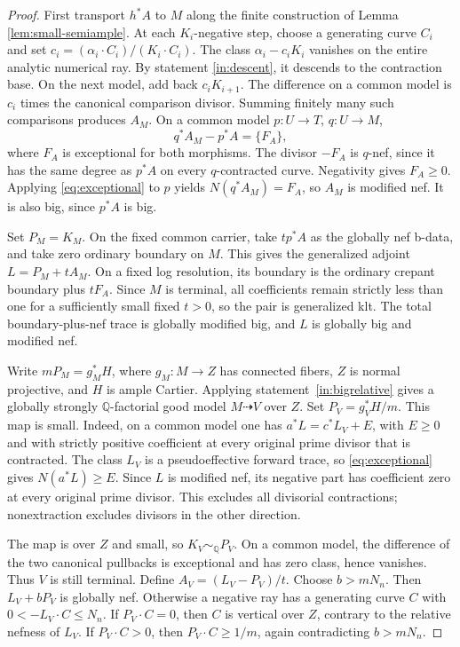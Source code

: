 \documentclass[11pt,a4paper]{article}
\theoremstyle{definition}\newtheorem{definition}[theorem]{Definition}
\theoremstyle{remark}\newtheorem*{remark}{Remark}
\newcommand{\Q}{\mathbb Q}\newcommand{\C}{\mathbb C}
\begin{document}
\begin{proof}
First transport $h^*A$ to $M$ along the finite construction of
Lemma \ref{lem:small-semiample}. At
each $K_i$-negative step, choose a generating curve $C_i$ and set
$c_i=(\alpha_i\cdot C_i)/(K_i\cdot C_i)$.
The class $\alpha_i-c_iK_i$ vanishes on the entire analytic numerical ray.
By statement \ref{in:descent}, it descends to the contraction base. On the next
model, add back $c_iK_{i+1}$. The difference on a common model is $c_i$ times
the canonical comparison divisor. Summing finitely many such
comparisons produces $A_M$. On a common model $p:U\to T$, $q:U\to M$,
\begin{equation}\label{eq:A-transport}
 q^*A_M-p^*A=\{F_A\},
\end{equation}
where $F_A$ is exceptional for both morphisms. The divisor $-F_A$ is $q$-nef,
since it has the same degree as $p^*A$ on every $q$-contracted curve.
Negativity gives $F_A\ge0$. Applying \eqref{eq:exceptional} to $p$ yields
$N(q^*A_M)=F_A$, so $A_M$ is modified nef. It is also big, since $p^*A$ is big.

Set $P_M=K_M$. On the fixed common carrier, take $tp^*A$ as the globally nef
b-data, and take zero ordinary boundary on $M$. This gives the generalized
adjoint $L=P_M+tA_M$. On a fixed log resolution, its boundary is the ordinary
crepant boundary plus $tF_A$. Since $M$ is terminal, all coefficients remain
strictly less than one for a sufficiently small fixed $t>0$, so the pair is
generalized klt. The total boundary-plus-nef trace is globally modified big,
and $L$ is globally big and modified nef.

Write $mP_M=g_M^*H$, where $g_M:M\to Z$ has connected fibers, $Z$ is normal
projective, and $H$ is ample Cartier. Applying statement~\ref{in:bigrelative}
gives a globally strongly $\Q$-factorial good model
$M\dashrightarrow V$ over $Z$. Set $P_V=g_V^*H/m$.
This map is small. Indeed, on a common model one has
$a^*L=c^*L_V+E$, with $E\ge0$ and with strictly positive coefficient at every
original prime divisor that is contracted. The class $L_V$ is a pseudoeffective
forward trace, so \eqref{eq:exceptional} gives $N(a^*L)\ge E$.
Since $L$ is modified nef, its negative part has coefficient zero at every
original prime divisor. This excludes all divisorial contractions;
nonextraction excludes divisors in the other direction.

The map is over $Z$ and small, so $K_V\sim_\Q P_V$.
On a common model, the difference of the two canonical pullbacks is
exceptional and has zero class, hence vanishes. Thus $V$ is still terminal.
Define $A_V=(L_V-P_V)/t$.
Choose $b>mN_n$. Then $L_V+bP_V$ is globally nef. Otherwise a negative ray
has a generating curve $C$ with $0<-L_V\cdot C\le N_n$.
If $P_V\cdot C=0$, then $C$ is vertical over $Z$, contrary to the relative
nefness of $L_V$. If $P_V\cdot C>0$, then $P_V\cdot C\ge1/m$, again
contradicting $b>mN_n$.


\end{proof}
\end{document}
